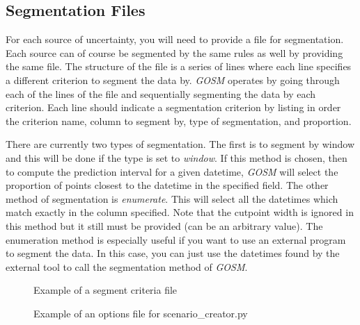\documentclass[11pt]{article}
\begin{document}
\subsection{Segmentation Files}
For each source of uncertainty, you will need to provide a file for segmentation. Each source can of course be segmented by the same rules as well by providing the same file.
The structure of the file is a series of lines where each line specifies a different criterion to segment the data by. \textit{GOSM} operates by going through each of the lines of the file and sequentially segmenting the data by each criterion. Each line should indicate a segmentation criterion by listing in order the criterion name, column to segment by, type of segmentation, and proportion. 
\bigskip

There are currently two types of segmentation. The first is to segment by window and this will be done if the type is set to \textit{window}. If this method is chosen, then to compute the prediction interval for a given datetime, \textit{GOSM} will select the proportion of points closest to the datetime in the specified field. The other method of segmentation is \textit{enumerate}. This will select all the datetimes which match exactly in the column specified. Note that the cutpoint width is ignored in this method but it still must be provided (can be an arbitrary value). The enumeration method is especially useful if you want to use an external program to segment the data. In this case, you can just use the datetimes found by the external tool to call the segmentation method of \textit{GOSM}.
\bigskip

\begin{figure}[H]
	\begin{framed}
		
	\end{framed}
	\caption{Example of a segment criteria file}
	\label{fig:segment}
\end{figure}

\begin{figure}[H]
	\begin{framed}
		
	\end{framed}
	\caption{Example of an options file for scenario\_creator.py}
	\label{fig:options_scenario_creator}
\end{figure}
\end{document}
